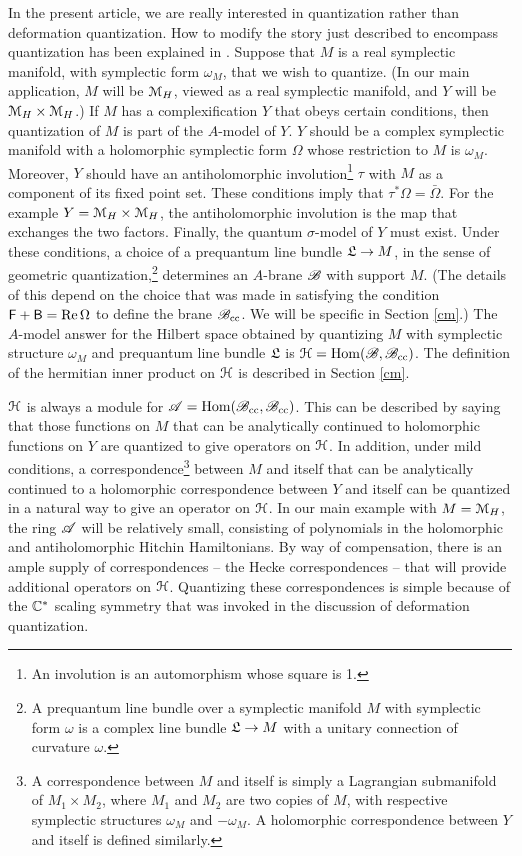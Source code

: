 \documentclass[11pt,a4paper]{article}
\begin{document}
In the present article, we are really interested in quantization rather than deformation quantization.   How to modify the story just described 
to encompass quantization has been explained in \cite{GuW,GW}.   Suppose that $M$ is a real symplectic manifold, with symplectic form $\omega_M$,
that we wish to quantize.  (In our main application, $M$ will be ${\mathcal M}_H$, viewed as a real symplectic manifold, and $Y$ will be ${\mathcal M}_H\times {\mathcal M}_H$.)     If $M$ has a complexification $Y$ that obeys certain conditions, then quantization of $M$ is part of the $A$-model of $Y$.
$Y$ should be a complex symplectic manifold with a holomorphic symplectic form $\Omega$ whose restriction to $M$ is $\omega_M$.   Moreover,
$Y$ should have an antiholomorphic involution\footnote{An involution is an automorphism whose square is 1.}  $\tau$ with $M$ as a component of its fixed point set.   These conditions imply that $\tau^*\Omega=\bar\Omega$.   For the example  $Y={\mathcal M}_H\times {\mathcal M}_H$, the antiholomorphic involution is the map that exchanges the two factors.
Finally, the quantum $\sigma$-model of $Y$ must exist.   Under these conditions, a choice of a prequantum line bundle  ${{{\mathfrak L}}}\to M$, in the 
sense of geometric quantization,\footnote{A prequantum line bundle over a symplectic manifold $M$ with symplectic form $\omega$ is a complex line
bundle ${{\mathfrak L}}\to M$ with a unitary connection of curvature $\omega$.}
 determines an $A$-brane ${\mathscr B}$ with support $M$.    (The details of this depend on the choice that was made in satisfying 
the condition ${\sf F}+{\sf B}={\mathrm{Re}}\,\Omega$ to
define the brane ${\mathscr B}_{\mathrm{cc}}$. We will be specific in Section \ref{cm}.)
The $A$-model answer for the Hilbert space obtained by
quantizing $M$ with symplectic structure $\omega_M$ and prequantum line bundle ${{\mathfrak L}}$ is ${\mathcal H}={\mathrm{Hom}}({\mathscr B},{\mathscr B}_{\mathrm{cc}})$. 
The definition of the hermitian inner product on ${\mathcal H}$ is described in Section \ref{cm}.

 ${\mathcal H}$ is always a module for ${\mathscr A}={\mathrm{Hom}}({\mathscr B}_{\mathrm{cc}},{\mathscr B}_{\mathrm{cc}})$. 
This can be described by saying that those functions on $M$ that can be analytically continued to holomorphic functions on $Y$ are quantized
to give operators on ${\mathcal H}$.    In addition, under mild conditions, a correspondence\footnote{A correspondence between $M$ and itself is simply
a Lagrangian submanifold of $M_1\times M_2$, where $M_1$ and $M_2$ are two copies of $M$, with respective symplectic structures $\omega_M$ and 
$-\omega_M$.    A  holomorphic correspondence between $Y$ and itself is defined similarly.}
between $M$ and itself that can be analytically continued to a holomorphic correspondence between
$Y$ and itself can be quantized in a natural way to give an operator on ${\mathcal H}$.   
 In our main example with $M={\mathcal M}_H$, the ring ${\mathscr A}$
will be relatively small, consisting of polynomials in the holomorphic and antiholomorphic Hitchin Hamiltonians.   By way of compensation, there is an ample
supply of correspondences -- the Hecke correspondences -- that will provide additional operators on ${\mathcal H}$.  Quantizing these correspondences is simple
because of the ${\mathbb C}^*$ scaling symmetry that was invoked in the discussion of deformation quantization.   
\end{document}
